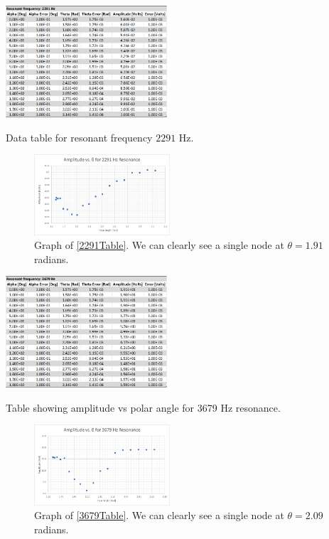 \documentclass[12pt]{article}
\begin{document}
	\begin{multicols}{2}
		\begin{table}[H]
			\includegraphics[width=0.45\textwidth]{Tables/2291Table.png}
			\caption{Data table for resonant frequency $2291$ Hz.}
			\label{2291Table}		
		\end{table} 
	\columnbreak
		\begin{figure}[H]
			\includegraphics[width=0.45\textwidth]{Graphs/2291Graph.png}
			\caption{Graph of \cref{2291Table}. We can clearly see a single node at $\theta = 1.91$ radians.}
			\label{2291Graph}
		\end{figure}
	\end{multicols}
	
	\begin{multicols}{2}
			\begin{table}[H]
			\includegraphics[width=0.45\textwidth]{Tables/3679Table.png}
			\caption{Table showing amplitude vs polar angle for 3679 Hz resonance.}
			\label{3679Table}		
		\end{table} 
	\columnbreak
		\begin{figure}[H]
			\includegraphics[width=0.45\textwidth]{Graphs/3679Graph.png}
			\caption{Graph of \cref{3679Table}. We can clearly see a single node at $\theta = 2.09$ radians.}
			\label{3679Graph}
		\end{figure}
	\end{multicols}
	
\end{document}
